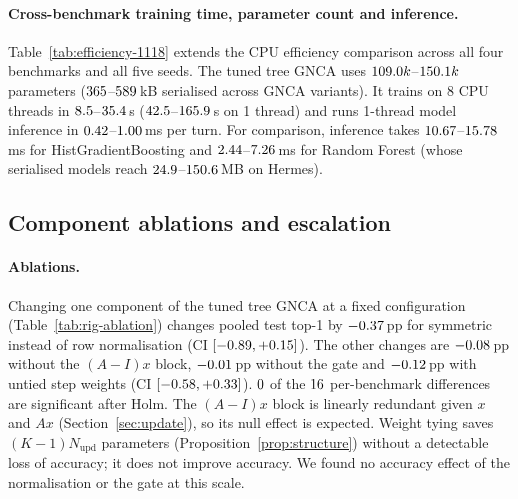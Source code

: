 \documentclass[10pt]{article}
\begin{document}
\paragraph{Cross-benchmark training time, parameter count and inference.} Table~\ref{tab:efficiency-1118} extends the CPU efficiency comparison across all four benchmarks and all five seeds. The tuned tree GNCA uses $109.0k$--$150.1k$ parameters ($365$--$589$\,kB serialised across GNCA variants). It trains on 8 CPU threads in $8.5$--$35.4$\,s ($42.5$--$165.9$\,s on 1 thread) and runs 1-thread model inference in $0.42$--$1.00$\,ms per turn. For comparison, inference takes $10.67$--$15.78$\,ms for HistGradientBoosting and $2.44$--$7.26$\,ms for Random Forest (whose serialised models reach $24.9$--$150.6$\,MB on Hermes).

\subsection{Component ablations and escalation}\label{sec:ablation}
\begin{table}[t]
\centering
\scriptsize
\setlength{\tabcolsep}{8pt}
\caption{Upper block: one-component ablations of the tuned tree GNCA at its selected configuration (difference in test top-1, pp, five seeds; Holm over 16; none significant). Lower block: escalation and calibration of the tuned tree GNCA (five seeds). Source S8.}
\label{tab:rig-ablation}

\end{table}

\paragraph{Ablations.} Changing one component of the tuned tree GNCA at a fixed configuration (Table~\ref{tab:rig-ablation}) changes pooled test top-1 by $-0.37$\,pp for symmetric instead of row normalisation (CI $[-0.89, +0.15]$). The other changes are $-0.08$\,pp without the $(A{-}I)x$ block, $-0.01$\,pp without the gate and $-0.12$\,pp with untied step weights (CI $[-0.58, +0.33]$). $0$ of the $16$ per-benchmark differences are significant after Holm. The $(A{-}I)x$ block is linearly redundant given $x$ and $Ax$ (Section~\ref{sec:update}), so its null effect is expected. Weight tying saves $(K{-}1)N_{\text{upd}}$ parameters (Proposition~\ref{prop:structure}) without a detectable loss of accuracy; it does not improve accuracy. We found no accuracy effect of the normalisation or the gate at this scale.
\end{document}
